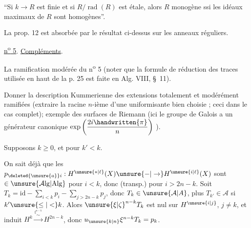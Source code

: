 ``Si $k\longrightarrow R$ est finie et si $R/\operatorname{rad}(R)$ est étale, alors $R$ monogène ssi les
idéaux maximaux de $R$ sont homogènes''.

La prop. 12 est absorbée par le résultat ci-dessus sur les anneaux réguliers.


\uline{n\textsuperscript{o} 5}. \uline{Compléments}.

La ramification modérée du n\textsuperscript{o} 5 (noter que la formule de réduction des traces
utilisée en haut de la p. 25 est faite en Alg. VIII, \S~11).

Donner la description Kummerienne des extensions totalement et modérément ramifiées
(extraire la racine $n$-ième d'une uniformisante bien choisie ; ceci dans le cas complet);
exemple des surfaces de Riemann (ici le groupe de Galois a un générateur canonique
$\exp\left(\dfrac{2i\handwritten{\pi}}{n}\right)$ ).

Supposons $k\geq 0$, et    pour $k'<k$.

On sait déjà que les $p_{\deleted{\unsure{a}}i}:H^{\unsure{*|\ell}}(X)\unsure{-|\to}H^{\unsure{i|\ell}}(X)$
sont $\in\unsure{\mathcal{A}\mathrm{lg}|\mathrm{Alg}}$ pour $i<k$, donc (transp.) pour
$i>2n-k$. Soit $T_k=\mathrm{id}-\sum_{i<k}p_i-\sum_{j>2n-k}p_j$, donc
$T_k\in\unsure{\mathcal{A}|A}$, plus  $T_{k'}\in\mathcal{A}$ si $k'\unsure{\leq|<}k$. Alors
$\unsure{\xi|\zeta}^{n-k}T_k$ est nul sur $H^{\unsure{i|j}}$, $j\neq k$, et induit
$H^k\xrightarrow{\overset{\xi^{n-k}}{\sim}}H^{2n-k}$, donc $u_{\unsure{k|n}}\xi^{n-k}T_k=p_k$.

